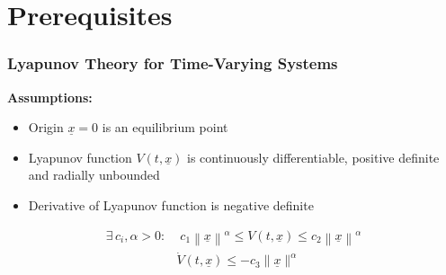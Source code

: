 \documentclass[student, noshadow, lsr, english, aspectratio=169, t]{ITR_LSR_slides}
\begin{document}

\section{Prerequisites}

\begin{frame}
	\frametitle{Lyapunov Theory for Time-Varying Systems}
	\textbf{Assumptions:}
	\begin{itemize}
		\item Origin $\underline{x}=0$ is an equilibrium point
		\item Lyapunov function $V(t,\underline{x})$ is continuously differentiable, positive definite and radially unbounded
		\item Derivative of Lyapunov function is negative definite
	\end{itemize}
	\vspace{0.2cm}
	\begin{tcolorbox}[title=Globally uniformly exponentially stable:]
		\vspace{-0.4cm}
		\begin{align*}
			\exists\, c_i, \alpha > 0: & \; c_1\left\|\underline{x}\right\|^\alpha \leq V(t,\underline{x}) \leq c_2\left\|\underline{x}\right\|^\alpha  \\
			& \dot{V}(t,\underline{x}) \leq -c_3\|\underline{x}\|^\alpha
		\end{align*}	
	\end{tcolorbox}
	
\end{frame}
\end{document}
